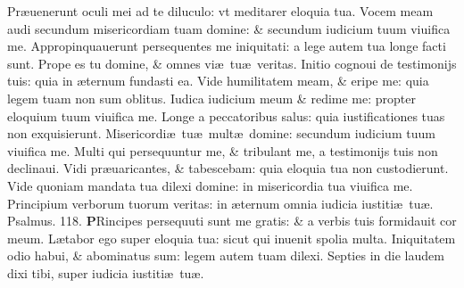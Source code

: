 \documentclass[a5paper,10pt]{book}
\def\ae{æ}
\begin{document}
\begin{multicols*}{2}
\newline \color{red} P\color{black}r\ae uenerunt oculi mei ad te diluculo: vt meditarer eloquia tua.
\newline \color{red} V\color{black}ocem meam audi secundum misericordiam tuam domine: \& secundum iudicium tuum viuifica me.
\newline \color{red} A\color{black}ppropinquauerunt persequentes me iniquitati: a lege autem tua longe facti sunt.
\newline \color{red} P\color{black}rope es tu domine, \& omnes vi\ae \ tu\ae \ veritas.
\newline \color{red} I\color{black}nitio cognoui de testimonijs tuis: quia in \ae ternum fundasti ea.
\newline \color{red} V\color{black}ide humilitatem meam, \& eripe me: quia legem tuam non sum oblitus.
\newline \color{red} I\color{black}udica iudicium meum \& redime me: propter eloquium tuum viuifica me.
\newline \color{red} L\color{black}onge a peccatoribus salus: quia iustificationes tuas non exquisierunt.
\newline \color{red} M\color{black}isericordi\ae \ tu\ae \ mult\ae \ domine: secundum iudicium tuum viuifica me.
\newline \color{red} M\color{black}ulti qui persequuntur me, \& tribulant me, a testimonijs tuis non declinaui.
\newline \color{red} V\color{black}idi pr\ae uaricantes, \& tabescebam: quia eloquia tua non custodierunt.
\newline \color{red} V\color{black}ide quoniam mandata tua dilexi domine: in misericordia tua viuifica me.
\newline \color{red} P\color{black}rincipium verborum tuorum veritas: in \ae ternum omnia iudicia iustiti\ae \ tu\ae . \quad \color{red} Psalmus. \hypertarget{ps118.11}{118.} \color{black}
\vspace{-.5em}
\lettrine[lines=2]{\bfseries \color{red} P}{}Rincipes persequuti sunt me gratis: \& a verbis tuis formidauit cor meum.%
\newline \color{red} L\color{black}\ae tabor ego super eloquia tua: sicut qui inuenit spolia multa.
\newline \color{red} I\color{black}niquitatem odio habui, \& abominatus sum: legem autem tuam dilexi.
\newline \color{red} S\color{black}epties in die laudem dixi tibi, super iudicia iustiti\ae \ tu\ae .

\end{multicols*}
\end{document}
